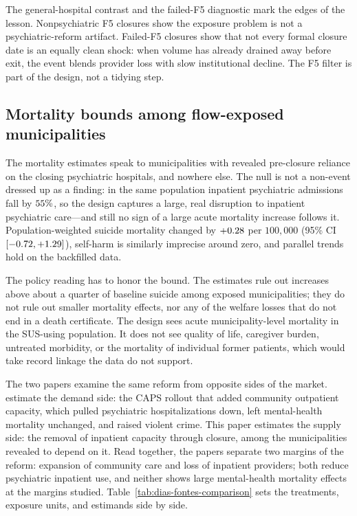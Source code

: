 The general-hospital contrast and the failed-F5 diagnostic mark the edges
of the lesson. Nonpsychiatric F5 closures show the exposure problem is not
a psychiatric-reform artifact. Failed-F5 closures show that not every
formal closure date is an equally clean shock: when volume has already
drained away before exit, the event blends provider loss with slow
institutional decline. The F5 filter is part of the design, not a tidying
step.

\subsection{Mortality bounds among flow-exposed municipalities}
\label{sec:discussion-policy}

The mortality estimates speak to municipalities with revealed pre-closure
reliance on the closing psychiatric hospitals, and nowhere else. The null
is not a non-event dressed up as a finding: in the same population
inpatient psychiatric admissions fall by $55\%$, so the
design captures a large, real disruption to inpatient psychiatric care---and still no sign of a
large acute mortality increase follows it. Population-weighted suicide mortality changed by $+0.28$
per $100{,}000$ (95\% CI $[-0.72, +1.29]$), self-harm is
similarly imprecise around zero, and parallel trends hold on the
backfilled data.

The policy reading has to honor the bound. The estimates rule out
increases above about a quarter of baseline suicide among exposed
municipalities; they do not rule out smaller mortality effects, nor any
of the welfare losses that do not end in a death certificate. The design
sees acute municipality-level mortality in the SUS-using population. It
does not see quality of life, caregiver burden, untreated morbidity, or
the mortality of individual former patients, which would take record
linkage the data do not support.

The two papers examine the same reform from opposite sides of the market.
\citet{diasFontes2024} estimate the demand side: the CAPS rollout that
added community outpatient capacity, which pulled psychiatric
hospitalizations down, left mental-health mortality unchanged, and raised
violent crime. This paper estimates the supply side: the removal of
inpatient capacity through closure, among the municipalities revealed to
depend on it. Read together, the papers separate two margins of the reform: expansion
of community care and loss of inpatient providers; both reduce
psychiatric inpatient use, and neither shows large mental-health
mortality effects at the margins studied.
Table~\ref{tab:dias-fontes-comparison} sets the treatments, exposure
units, and estimands side by side.


